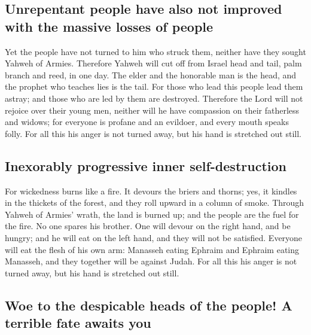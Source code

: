 \hypertarget{unrepentant-people-have-also-not-improved-with-the-massive-losses-of-people}{%
\subsection{Unrepentant people have also not improved with the massive
losses of
people}\label{unrepentant-people-have-also-not-improved-with-the-massive-losses-of-people}}

 Yet the people have not turned to him who struck them,
neither have they sought Yahweh of Armies.  Therefore
Yahweh will cut off from Israel head and tail, palm branch and reed, in
one day.  The elder and the honorable man is the head,
and the prophet who teaches lies is the tail.  For those
who lead this people lead them astray; and those who are led by them are
destroyed.  Therefore the Lord will not rejoice over
their young men, neither will he have compassion on their fatherless and
widows; for everyone is profane and an evildoer, and every mouth speaks
folly. For all this his anger is not turned away, but his hand is
stretched out still.

\hypertarget{inexorably-progressive-inner-self-destruction}{%
\subsection{Inexorably progressive inner
self-destruction}\label{inexorably-progressive-inner-self-destruction}}

 For wickedness burns like a fire. It devours the briers
and thorns; yes, it kindles in the thickets of the forest, and they roll
upward in a column of smoke.  Through Yahweh of Armies'
wrath, the land is burned up; and the people are the fuel for the fire.
No one spares his brother.  One will devour on the right
hand, and be hungry; and he will eat on the left hand, and they will not
be satisfied. Everyone will eat the flesh of his own arm:
 Manasseh eating Ephraim and Ephraim eating Manasseh, and
they together will be against Judah. For all this his anger is not
turned away, but his hand is stretched out still.

\hypertarget{woe-to-the-despicable-heads-of-the-people-a-terrible-fate-awaits-you}{%
\subsection{Woe to the despicable heads of the people! A terrible fate
awaits
you}\label{woe-to-the-despicable-heads-of-the-people-a-terrible-fate-awaits-you}}


